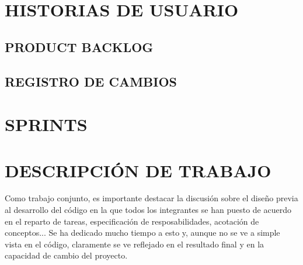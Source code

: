 \documentclass[../DocumentoOficial.tex]{subfiles}
\begin{document}
\chapter{HISTORIAS DE USUARIO}\label{historias_usuario}
\section{PRODUCT BACKLOG}\label{product_backlog}

\section{REGISTRO DE CAMBIOS}\label{reg_cambios}


\chapter{SPRINTS}\label{sprints}







\chapter{DESCRIPCIÓN DE TRABAJO}\label{work_desc}
Como trabajo conjunto, es importante destacar la discusión sobre el diseño previa al desarrollo del código en la que todos los integrantes se han puesto de acuerdo en el reparto de tareas, especificación de resposabilidades, acotación de conceptos... Se ha dedicado mucho tiempo a esto y, aunque no se ve a simple vista en el código, claramente se ve reflejado en el resultado final y en la capacidad de cambio del proyecto.


\end{document}
